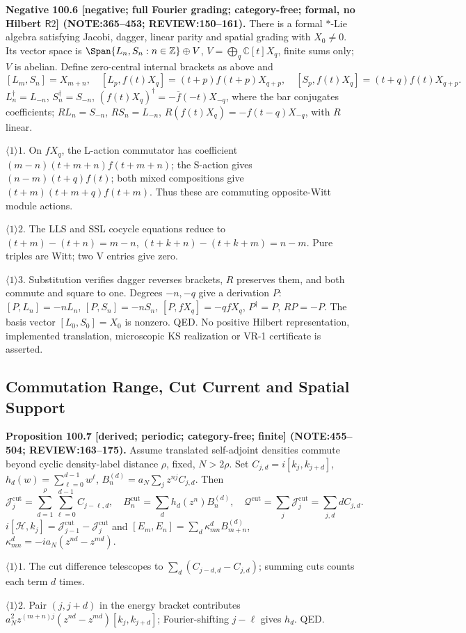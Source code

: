 \textbf{Negative 100.6 [negative; full Fourier grading; category-free; formal, no Hilbert \(\mathsf R2\)] (NOTE:365--453; REVIEW:150--161).}
There is a formal \(*\)-Lie algebra satisfying Jacobi, dagger, linear parity and spatial grading with \(X_0\ne0\).
Its vector space is \(\Span\{L_n,S_n:n\in\mathbb Z\}\oplus V\), \(V=\bigoplus_q\mathbb C[t]X_q\), finite sums only; \(V\) is abelian. Define zero-central internal brackets as above and
\[
 [L_m,S_n]=X_{m+n},\quad [L_p,f(t)X_q]=(t+p)f(t+p)X_{q+p},\quad
 [S_p,f(t)X_q]=(t+q)f(t)X_{q+p}.
\]
\(L_n^\dagger=L_{-n}\), \(S_n^\dagger=S_{-n}\), \((f(t)X_q)^\dagger=-\overline f(-t)X_{-q}\), where the bar
conjugates coefficients; \(RL_n=S_{-n}\), \(RS_n=L_{-n}\), \(R(f(t)X_q)=-f(t-q)X_{-q}\), with \(R\) linear.
\par\(\langle1\rangle1\). On \(fX_q\), the L-action commutator has coefficient
\((m-n)(t+m+n)f(t+m+n)\); the S-action gives \((n-m)(t+q)f(t)\); both mixed compositions give
\((t+m)(t+m+q)f(t+m)\). Thus these are commuting opposite-Witt module actions.
\par\(\langle1\rangle2\). The LLS and SSL cocycle equations reduce to
\((t+m)-(t+n)=m-n\), \((t+k+n)-(t+k+m)=n-m\). Pure triples are Witt; two V entries give zero.
\par\(\langle1\rangle3\). Substitution verifies dagger reverses brackets, \(R\) preserves them, and both commute
and square to one. Degrees \(-n,-q\) give a derivation \(P\): \([P,L_n]=-nL_n\), \([P,S_n]=-nS_n\),
\([P,fX_q]=-qfX_q\), \(P^\dagger=P\), \(RP=-P\). The basis vector \([L_0,S_0]=X_0\) is nonzero. QED.
No positive Hilbert representation, implemented translation, microscopic KS realization or VR-1 certificate is asserted.

\subsection{Commutation Range, Cut Current and Spatial Support}

\textbf{Proposition 100.7 [derived; periodic; category-free; finite] (NOTE:455--504; REVIEW:163--175).}
Assume translated self-adjoint densities commute beyond cyclic density-label distance \(\rho\), fixed, \(N>2\rho\).
Set \(C_{j,d}=i[k_j,k_{j+d}]\), \(h_d(w)=\sum_{\ell=0}^{d-1}w^\ell\), \(B_n^{(d)}=a_N\sum_jz^{nj}C_{j,d}\). Then
\[
 \mathcal J_j^{\mathrm{cut}}=\sum_{d=1}^{\rho}\sum_{\ell=0}^{d-1}C_{j-\ell,d},\quad
 B_n^{\mathrm{cut}}=\sum_dh_d(z^n)B_n^{(d)},\quad
 \mathcal Q^{\mathrm{cut}}=\sum_j\mathcal J_j^{\mathrm{cut}}=\sum_{j,d}dC_{j,d}.
\]
\(i[\mathcal H,k_j]=\mathcal J_{j-1}^{\mathrm{cut}}-\mathcal J_j^{\mathrm{cut}}\) and
\([E_m,E_n]=\sum_d\kappa^d_{mn}B_{m+n}^{(d)}\), \(\kappa^d_{mn}=-ia_N(z^{nd}-z^{md})\).
\par\(\langle1\rangle1\). The cut difference telescopes to \(\sum_d(C_{j-d,d}-C_{j,d})\); summing cuts counts each term \(d\) times.
\par\(\langle1\rangle2\). Pair \((j,j+d)\) in the energy bracket contributes
\(a_N^2z^{(m+n)j}(z^{nd}-z^{md})[k_j,k_{j+d}]\); Fourier-shifting \(j-\ell\) gives \(h_d\). QED.


